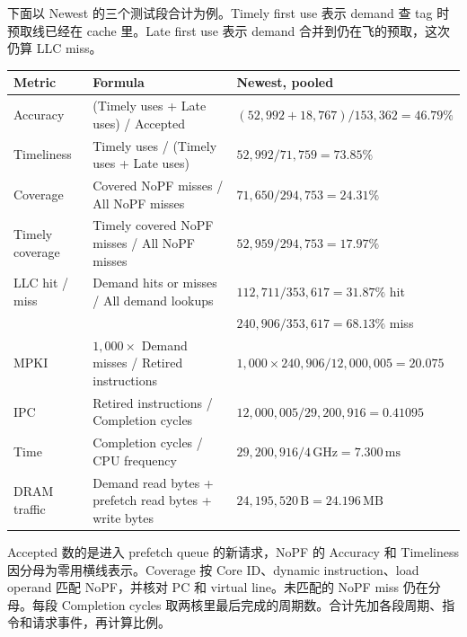 \documentclass[10pt,letterpaper]{article}
\newcommand{\subhead}[1]{\vspace{5pt}{\large\bfseries #1}\par}
\newcommand{\smallnote}[1]{{\small\color{muted}#1}\par}
\begin{document}
\subhead{每个数字怎么从日志算出来？}
\smallnote{下面以 Newest 的三个测试段合计为例。Timely first use 表示 demand 查 tag 时预取线已经在 cache 里。Late first use 表示 demand 合并到仍在飞的预取，这次仍算 LLC miss。}
{\small
\begin{tabular}{@{}>{\raggedright\arraybackslash}p{2.34cm}>{\raggedright\arraybackslash}p{7.23cm}>{\raggedright\arraybackslash}p{7.39cm}@{}}
\toprule
\textbf{Metric} & \textbf{Formula} & \textbf{Newest, pooled}\\
\midrule
Accuracy & (Timely uses + Late uses) / Accepted & $(52{,}992+18{,}767)/153{,}362=46.79\%$\\[2pt]
Timeliness & Timely uses / (Timely uses + Late uses) & $52{,}992/71{,}759=73.85\%$\\[2pt]
Coverage & Covered NoPF misses / All NoPF misses & $71{,}650/294{,}753=24.31\%$\\[2pt]
Timely coverage & Timely covered NoPF misses / All NoPF misses & $52{,}959/294{,}753=17.97\%$\\[2pt]
LLC hit / miss & Demand hits or misses / All demand lookups & $112{,}711/353{,}617=31.87\%$ hit\\
 & & $240{,}906/353{,}617=68.13\%$ miss\\[2pt]
MPKI & $1{,}000\times$ Demand misses / Retired instructions & $1{,}000\times240{,}906/12{,}000{,}005=20.075$\\[2pt]
IPC & Retired instructions / Completion cycles & $12{,}000{,}005/29{,}200{,}916=0.41095$\\[2pt]
Time & Completion cycles / CPU frequency & $29{,}200{,}916/4\,\mathrm{GHz}=7.300\,\mathrm{ms}$\\[2pt]
DRAM traffic & Demand read bytes + prefetch read bytes + write bytes & $24{,}195{,}520\,\mathrm{B}=24.196\,\mathrm{MB}$\\
\bottomrule
\end{tabular}\par}
\smallnote{Accepted 数的是进入 prefetch queue 的新请求，NoPF 的 Accuracy 和 Timeliness 因分母为零用横线表示。Coverage 按 Core ID、dynamic instruction、load operand 匹配 NoPF，并核对 PC 和 virtual line。未匹配的 NoPF miss 仍在分母。每段 Completion cycles 取两核里最后完成的周期数。合计先加各段周期、指令和请求事件，再计算比例。}


\end{document}
